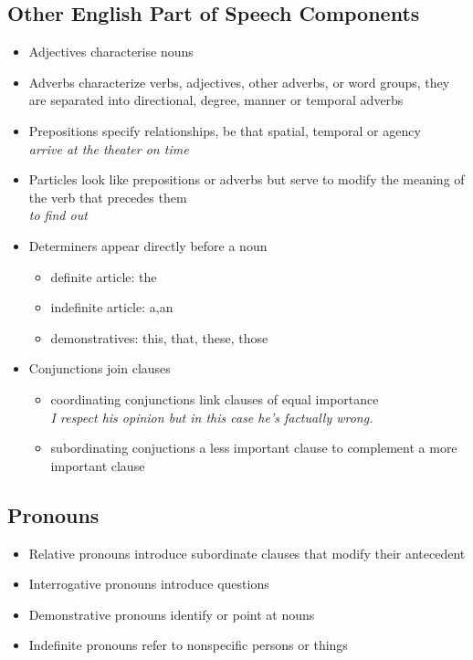 \documentclass[11pt]{article}
\begin{document}
\subsection{Other English Part of Speech Components}
\begin{itemize}
	\item Adjectives characterise nouns
	\item Adverbs characterize verbs, adjectives, other adverbs, or word groups, they are separated into directional, degree, manner or temporal adverbs
	\item Prepositions specify relationships, be that spatial, temporal or agency\\
	\emph{arrive at the theater on time}
	\item Particles look like prepositions or adverbs but serve to modify the meaning of the verb that precedes them\\
	\emph{to find out}
	\item Determiners appear directly before a noun
	\begin{itemize}
		\item definite article: the
		\item indefinite article: a,an
		\item demonstratives: this, that, these, those
	\end{itemize}
	\item Conjunctions join clauses
	\begin{itemize}
		\item coordinating conjunctions link clauses of equal importance\\
		\emph{I respect his opinion but in this case he's factually wrong.}
		\item subordinating conjuctions a less important clause to complement a more important clause
	\end{itemize}
\end{itemize}

\subsection{Pronouns}
\begin{itemize}
	\item Relative pronouns introduce subordinate clauses that modify their antecedent
	\item Interrogative pronouns introduce questions
	\item Demonstrative pronouns identify or point at nouns
	\item Indefinite pronouns refer to nonspecific persons or things
\end{itemize}
\end{document}
